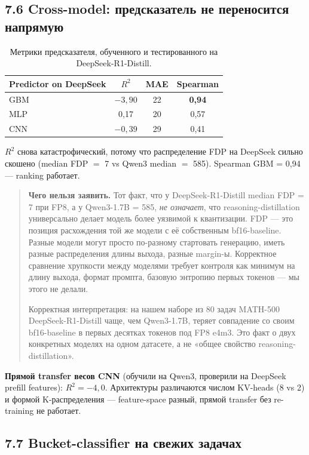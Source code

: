\documentclass[a4paper,12pt]{article}
\begin{document}
\subsection*{7.6 Cross-model: предсказатель не переносится напрямую}

\begin{table}[H]
\centering
\caption{Метрики предсказателя, обученного и тестированного на
DeepSeek-R1-Distill.}
\label{tab:deepseekpred}
\begin{tabular}{lccc}
\toprule
Predictor on DeepSeek & $R^2$ & MAE & Spearman \\
\midrule
GBM & $-3{,}90$ & 22 & \textbf{0,94} \\
MLP & 0,17 & 20 & 0,57 \\
CNN & $-0{,}39$ & 29 & 0,41 \\
\bottomrule
\end{tabular}
\end{table}

$R^2$ снова катастрофический, потому что распределение FDP на DeepSeek
сильно скошено (median FDP $=$ 7 vs Qwen3 median $=$ 585). Spearman
GBM = 0,94 --- ranking работает.

\begin{quote}
\textbf{Чего нельзя заявить.} Тот факт, что у DeepSeek-R1-Distill median
FDP = 7 при FP8, а у Qwen3-1.7B = 585, \textit{не означает}, что
reasoning-distillation универсально делает модель более уязвимой к
квантизации. FDP --- это позиция расхождения той же модели с её
собственным bf16-baseline. Разные модели могут просто по-разному
стартовать генерацию, иметь разные распределения длины выхода, разные
margin-ы. Корректное сравнение хрупкости между моделями требует
контроля как минимум на длину выхода, формат промпта, базовую энтропию
первых токенов --- мы этого не делали.

Корректная интерпретация: на нашем наборе из 80 задач MATH-500
DeepSeek-R1-Distill чаще, чем Qwen3-1.7B, теряет совпадение со своим
bf16-baseline в первых десятках токенов под FP8 e4m3. Это факт о двух
конкретных моделях на одном датасете, а не «общее свойство
reasoning-distillation».
\end{quote}

\textbf{Прямой transfer весов CNN} (обучили на Qwen3, проверили на
DeepSeek prefill features): $R^2 = -4{,}0$. Архитектуры различаются
числом KV-heads (8 vs 2) и формой K-распределения --- feature-space
разный, прямой transfer без re-training не работает.

\subsection*{7.7 Bucket-classifier на свежих задачах}
\end{document}
